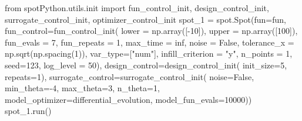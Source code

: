 \documentclass[
  letterpaper,
  DIV=11,
  numbers=noendperiod]{scrreprt}
\newenvironment{Shaded}{\begin{snugshade}}{\end{snugshade}}
\newcommand{\DecValTok}[1]{\textcolor[rgb]{0.68,0.00,0.00}{#1}}
\newcommand{\ImportTok}[1]{\textcolor[rgb]{0.00,0.46,0.62}{#1}}
\newcommand{\NormalTok}[1]{\textcolor[rgb]{0.00,0.23,0.31}{#1}}
\newcommand{\OperatorTok}[1]{\textcolor[rgb]{0.37,0.37,0.37}{#1}}
\newcommand{\StringTok}[1]{\textcolor[rgb]{0.13,0.47,0.30}{#1}}
\newcommand{\VariableTok}[1]{\textcolor[rgb]{0.07,0.07,0.07}{#1}}
\begin{document}
\begin{Shaded}
\begin{Highlighting}[]
\ImportTok{from}\NormalTok{ spotPython.utils.init }\ImportTok{import}\NormalTok{ fun\_control\_init, design\_control\_init, surrogate\_control\_init, optimizer\_control\_init}
\NormalTok{spot\_1 }\OperatorTok{=}\NormalTok{ spot.Spot(fun}\OperatorTok{=}\NormalTok{fun,}
\NormalTok{                   fun\_control}\OperatorTok{=}\NormalTok{fun\_control\_init(}
\NormalTok{                        lower }\OperatorTok{=}\NormalTok{ np.array([}\OperatorTok{{-}}\DecValTok{10}\NormalTok{]),}
\NormalTok{                        upper }\OperatorTok{=}\NormalTok{ np.array([}\DecValTok{100}\NormalTok{]),}
\NormalTok{                        fun\_evals }\OperatorTok{=} \DecValTok{7}\NormalTok{,}
\NormalTok{                        fun\_repeats }\OperatorTok{=} \DecValTok{1}\NormalTok{,}
\NormalTok{                        max\_time }\OperatorTok{=}\NormalTok{ inf,}
\NormalTok{                        noise }\OperatorTok{=} \VariableTok{False}\NormalTok{,}
\NormalTok{                        tolerance\_x }\OperatorTok{=}\NormalTok{ np.sqrt(np.spacing(}\DecValTok{1}\NormalTok{)),}
\NormalTok{                        var\_type}\OperatorTok{=}\NormalTok{[}\StringTok{"num"}\NormalTok{],}
\NormalTok{                        infill\_criterion }\OperatorTok{=} \StringTok{"y"}\NormalTok{,}
\NormalTok{                        n\_points }\OperatorTok{=} \DecValTok{1}\NormalTok{,}
\NormalTok{                        seed}\OperatorTok{=}\DecValTok{123}\NormalTok{,}
\NormalTok{                        log\_level }\OperatorTok{=} \DecValTok{50}\NormalTok{),}
\NormalTok{                   design\_control}\OperatorTok{=}\NormalTok{design\_control\_init(}
\NormalTok{                        init\_size}\OperatorTok{=}\DecValTok{5}\NormalTok{,}
\NormalTok{                        repeats}\OperatorTok{=}\DecValTok{1}\NormalTok{),}
\NormalTok{                   surrogate\_control}\OperatorTok{=}\NormalTok{surrogate\_control\_init(}
\NormalTok{                        noise}\OperatorTok{=}\VariableTok{False}\NormalTok{,}
\NormalTok{                        min\_theta}\OperatorTok{={-}}\DecValTok{4}\NormalTok{,}
\NormalTok{                        max\_theta}\OperatorTok{=}\DecValTok{3}\NormalTok{,}
\NormalTok{                        n\_theta}\OperatorTok{=}\DecValTok{1}\NormalTok{,}
\NormalTok{                        model\_optimizer}\OperatorTok{=}\NormalTok{differential\_evolution,}
\NormalTok{                        model\_fun\_evals}\OperatorTok{=}\DecValTok{10000}\NormalTok{))}
\NormalTok{spot\_1.run()}
\end{Highlighting}
\end{Shaded}
\end{document}
